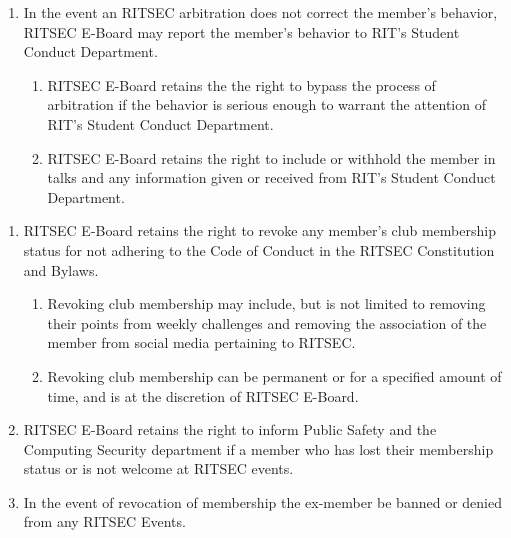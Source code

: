 
\begin{enumerate}
  \item In the event an RITSEC arbitration does not correct the member’s
    behavior, RITSEC E-Board may report the member’s behavior to RIT’s Student
    Conduct Department. 
  \begin{enumerate}
    \item RITSEC E-Board retains the the right to bypass the process of
      arbitration if the behavior is serious enough to warrant the attention of
      RIT’s Student Conduct Department.
    \item RITSEC E-Board retains the right to include or withhold the member in
      talks and any information given or received from RIT’s Student Conduct
      Department.
  \end{enumerate}
\end{enumerate}


\begin{enumerate}
  \item RITSEC E-Board retains the right to revoke any member’s club membership
    status for not adhering to the Code of Conduct in the RITSEC Constitution
    and Bylaws. 
  \begin{enumerate}
    \item Revoking club membership may include, but is not limited to removing
      their points from weekly challenges and removing the association of the
      member from social media pertaining to RITSEC.
    \item Revoking club membership can be permanent or for a specified amount
      of time, and is at the discretion of RITSEC E-Board.
  \end{enumerate}
  \item RITSEC E-Board retains the right to inform Public Safety and the
    Computing Security department if a member who has lost their membership
    status or is not welcome at RITSEC events.
  \item In the event of revocation of membership the ex-member be banned or
    denied from any RITSEC Events.
\end{enumerate}


